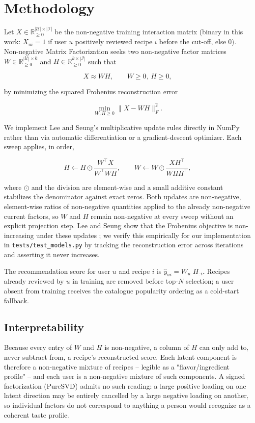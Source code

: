 \section{Methodology}
\label{sec:methodology}
Let $X \in \mathbb{R}_{\ge 0}^{|\mathcal{U}| \times |\mathcal{I}|}$ be the
non-negative training interaction matrix (binary in this work: $X_{ui}=1$
if user $u$ positively reviewed recipe $i$ before the cut-off, else $0$).
Non-negative Matrix Factorization seeks two non-negative factor matrices
$W \in \mathbb{R}_{\ge 0}^{|\mathcal{U}| \times k}$ and
$H \in \mathbb{R}_{\ge 0}^{k \times |\mathcal{I}|}$ such that

\[
X \approx WH, \qquad W \ge 0,\ H \ge 0,
\]

by minimizing the squared Frobenius reconstruction error

\[
\min_{W,H \ge 0} \lVert X - WH \rVert_F^2.
\]

We implement Lee and Seung's multiplicative update rules
\cite{lee1999learning} directly in NumPy rather than via automatic
differentiation or a gradient-descent optimizer. Each sweep applies, in
order,

\[
H \leftarrow H \odot \frac{W^\top X}{W^\top W H},
\qquad
W \leftarrow W \odot \frac{X H^\top}{W H H^\top},
\]

where $\odot$ and the division are element-wise and a small additive
constant stabilizes the denominator against exact zeros. Both updates are
non-negative, element-wise ratios of non-negative quantities applied to the
already non-negative current factors, so $W$ and $H$ remain non-negative at
every sweep without an explicit projection step. Lee and Seung show that
the Frobenius objective is non-increasing under these updates
\cite{lee2001algorithms}; we verify this empirically for our
implementation in \texttt{tests/test\_models.py} by tracking the
reconstruction error across iterations and asserting it never increases.

The recommendation score for user $u$ and recipe $i$ is $\hat y_{ui} =
W_{u:} H_{:i}$. Recipes already reviewed by $u$ in training are removed
before top-$N$ selection; a user absent from training receives the
catalogue popularity ordering as a cold-start fallback.

\subsection{Interpretability}
Because every entry of $W$ and $H$ is non-negative, a column of $H$ can only
add to, never subtract from, a recipe's reconstructed score. Each latent
component is therefore a non-negative mixture of recipes -- legible as a
"flavor/ingredient profile" -- and each user is a non-negative mixture of
such components. A signed factorization (PureSVD) admits no such reading:
a large positive loading on one latent direction may be entirely cancelled
by a large negative loading on another, so individual factors do not
correspond to anything a person would recognize as a coherent taste
profile.


